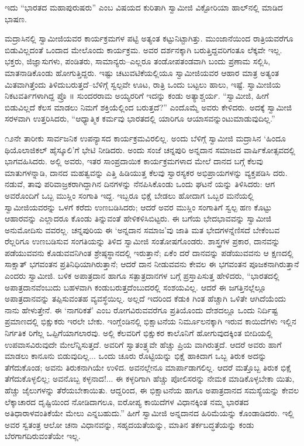 ಇದು “ಭಾರತದ ಮಹಾಪುರುಷರು” ಎಂಬ ವಿಷಯದ ಕುರಿತಾಗಿ ಸ್ವಾಮೀಜಿ ವಿಕ್ಟೋರಿಯಾ ಹಾಲ್​ನಲ್ಲಿ ಮಾಡಿದ ಭಾಷಣ.

ಮದ್ರಾಸಿನಲ್ಲಿ ಸ್ವಾಮೀಜಿಯವರ ಕಾರ್ಯಕ್ರಮಗಳ ಪಟ್ಟಿ ಅತ್ಯಂತ ಕಟ್ಟುನಿಟ್ಟಾಗಿತ್ತು. ಮುಂಜಾನೆಯಿಂದ ರಾತ್ರಿಯವರೆಗೂ ಬಿಡುವಿಲ್ಲದಂತೆ ಒಂದಾದ ಮೇಲೊಂದು ಕಾರ್ಯಕ್ರಮ. ಅವರ ದರ್ಶನಕ್ಕಾಗಿ ಬರುತ್ತಿದ್ದವರಿಗಂತೂ ಲೆಕ್ಕವೇ ಇಲ್ಲ. ಭಕ್ತರು, ಜಿಜ್ಞಾಸುಗಳು, ಪಂಡಿತರು, ಸಾಮಾನ್ಯರು–ಎಲ್ಲರೂ ತಂಡೋಪತಂಡವಾಗಿ ಬಂದು ಪ್ರಣಾಮ ಸಲ್ಲಿಸಿ, ಮಾತನಾಡಿಕೊಂಡು ಹೋಗುತ್ತಿದ್ದರು. ಇಷ್ಟು ಚಟುವಟಿಕೆಯಲ್ಲಿಯೂ ಸ್ವಾಮೀಜಿಯವರ ಆಹಾರ ಮಾತ್ರ ಅತ್ಯಂತ ಮಿತವಾಗಿತ್ತೆಂದು ತಿಳಿದುಬರುತ್ತದೆ–ಬೆಳಿಗ್ಗೆ ಸ್ವಲ್ಪವೇ ಊಟ, ರಾತ್ರಿ ಒಂದು ಬಟ್ಟಲು ಹಾಲು, ಇಷ್ಟೆ. ಸ್ವಾಮೀಜಿಯ ನಿಕಟವರ್ತಿಗಳಾಗಿದ್ದ ಪ್ರೊ ॥ ಸುಂದರರಾಮ ಅಯ್ಯರರಿಗೆ ಇದನ್ನು ಕಂಡು ಅತ್ಯಾಶ್ಚರ್ಯ. “ಸ್ವಾಮೀಜಿ, ಹೀಗೆ ಬಿಡುವಿಲ್ಲದೆ ಕೆಲಸ ಮಾಡಲು ನಿಮಗೆ ಶಕ್ತಿಯೆಲ್ಲಿಂದ ಬರುತ್ತದೆ?” ಎಂದೊಮ್ಮೆ ಅವರು ಕೇಳಿದರು. ಅದಕ್ಕೆ ಸ್ವಾಮೀಜಿ ಸರಳವಾಗಿ ಉತ್ತರಿಸಿದರು, “ಆಧ್ಯಾತ್ಮಿಕ ಕರ್ಮವು ಭಾರತದಲ್ಲಿ ಯಾರಿಗೂ ಆಯಾಸವನ್ನುಂಟುಮಾಡುವುದಿಲ್ಲ.”

೧೨ನೇ ತಾರೀಕು ಸಾರ್ವಜನಿಕ ಉಪನ್ಯಾಸದ ಕಾರ್ಯಕ್ರಮವಿರಲಿಲ್ಲ. ಅಂದು ಬೆಳಿಗ್ಗೆ ಸ್ವಾಮೀಜಿ ಮದ್ರಾಸಿನ ‘ಹಿಂದೂ ಥಿಯೊಲಾಜಿಕಲ್ ಹೈಸ್ಕೂಲಿ’ಗೆ ಭೇಟಿ ನೀಡಿದರು. ಅಂದು ಸಂಜೆ ಚನ್ನಪುರಿ ಅನ್ನದಾನ ಸಮಾಜದ ವಾರ್ಷಿಕೋತ್ಸವದಲ್ಲಿ ಭಾಗವಹಿಸಿದರು. ಅಲ್ಲಿ ಅವರು, ಇತರ ಸಾಂಪ್ರದಾಯಿಕ ಕಾರ್ಯಕ್ರಮಗಳಾದ ಮೇಲೆ ದಾನದ ಬಗ್ಗೆ ಕೆಲವು ಮಾತುಗಳನ್ನಾಡಿ, ದಾನದ ಮಹತ್ವವನ್ನು ಎತ್ತಿ ಹಿಡಿಯುತ್ತ ಕೆಲವು ಸ್ವಾರಸ್ಯಕರ ಅಭಿಪ್ರಾಯಗಳನ್ನು ವ್ಯಕ್ತಪಡಿಸಿ ದರು. ನಡುವೆ, ತಾವು ಪರಿವಾಜ್ರಕರಾಗಿದ್ದಾಗಿನ ದಿನಗಳನ್ನು ನೆನಪಿಸಿಕೊಂಡು ಒಂದು ಘಟನೆ ಯನ್ನು ತಿಳಿಸಿದರು: ಆಗ ಅವರೊಂದಿಗೆ ಒಬ್ಬ ಮುಸ್ಲಿಂ ಸಂಗಾತಿ ಇದ್ದ. ಇಬ್ಬರೂ ಭಿಕ್ಷೆ ಬೇಡಲು ಹೋದಾಗ ಒಬ್ಬರ ಮನೆಯಲ್ಲಿ ಸ್ವಾಮೀಜಿಯವರನ್ನು ಒಳಗೆ ಕರೆದು ಉಣಬಡಿಸಿದರು; ಆದರೆ ಅವರ ಮುಸ್ಲಿಂ ಸಂಗಾತಿಗೆ ಸ್ವಲ್ಪ ಹಣ ಕೊಟ್ಟು ಆಹಾರವನ್ನು ಎಲ್ಲಾದರೂ ಕೊಂಡು ತಿನ್ನುವಂತೆ ಹೇಳಿಕಳಿಸಿಬಿಟ್ಟರು. ಈ ಬಗೆಯ ಭೇದಭಾವವನ್ನು ಸ್ವಾಮೀಜಿ ಅನುಮೋದಿಸು ವವರಲ್ಲ. ಚನ್ನಪುರಿಯ ಈ ‘ಅನ್ನದಾನ ಸಮಾಜ’ವು ಜಾತಿ ಮತ ಭೇದಗಳನ್ನೆಣಿಸದೆ ಬೇಕೆಂಬವ ರೆಲ್ಲರಿಗೂ ಉಣಬಡಿಸುವ ಸಂಗತಿಯನ್ನು ತಿಳಿದ ಸ್ವಾಮೀಜಿ ಸಂತೋಷಗೊಂಡರು. ಶಾಸ್ತ್ರಗಳ ಪ್ರಕಾರ, ದಾನವನ್ನು ಪಡೆಯುವವನು ಕೊಡುವವನಿಗಿಂತ ಶ್ರೇಷ್ಠಸ್ಥಾನದಲ್ಲಿ ಇರುತ್ತಾನೆ; ಏಕೆಂ ದರೆ ದಾನವನ್ನು ಪಡೆಯುವವನು ಆ ಕ್ಷಣದಲ್ಲಿ ಸಾಕ್ಷಾತ್ ಭಗವಂತನ ಪ್ರತಿನಿಧಿಯಾಗಿರುತ್ತಾನೆ; ಆದರೆ ದಾನ ನೀಡುವವನು ಕೇವಲ ಈ ಭಗವಂತನ ಪೂಜಕನಾಗಿರುತ್ತಾನೆ ಎಂದರು ಸ್ವಾಮೀಜಿ. ಬಳಿಕ ಅಪಾತ್ರದಾನ ಹಾಗೂ ಸತ್ಪಾತ್ರದಾನಗಳ ಬಗ್ಗೆ ಪ್ರಸ್ತಾಪಿಸುತ್ತ ಹೇಳಿದರು, “ಭಾರತದಲ್ಲಿ ಅಪಾತ್ರದಾನವೆಂಬುದು ಬಹಳವಾಗಿ ಕಂಡುಬರುತ್ತದೆಂಬುದರಲ್ಲಿ ಸಂಶಯವಿಲ್ಲ. ಆದರೆ ಈ ಜಗತ್ತಿನಲ್ಲೆಲ್ಲೂ ಅಪಾತ್ರದಾನವನ್ನು ತಪ್ಪಿಸುವಂತಹ ವ್ಯವಸ್ಥೆಯಿಲ್ಲ. ಅಲ್ಲದೆ ಇದರಿಂದ ಕೆಡುಕಿ ಗಿಂತ ಹೆಚ್ಚಾಗಿ ಒಳಿತೇ ಆಗಿದೆಯೆಂದು ನಾನು ಹೇಳುತ್ತೇನೆ. ಈ ‘ನಾಗರಿಕತೆ’ ಎಂಬ ರೋಗವಿರುವವರೆಗೂ ಪ್ರತಿಯೊಂದು ದೇಶದಲ್ಲೂ ಒಂದು ನಿರ್ದಿಷ್ಟ ಪ್ರಮಾಣದಲ್ಲಿ ಭಿಕ್ಷುಕರು ಇರಲೇ ಬೇಕು. ಇಂಗ್ಲೆಂಡಿನಲ್ಲಿ ಭಿಕ್ಷಾಟನೆಯ ನಿರ್ಮೂಲನಕ್ಕಾಗಿ ಇರುವ ಕಾಯಿದೆಗಳು ಇಲ್ಲಿನ ನಿರ್ಗತಿಕ ರಿಗೆಲ್ಲ ಒಪ್ಪಿಗೆಯಾಗಲಾರವು. ಅಲ್ಲಿ ಕೆಲವರಿಗೆ ಭಿಕ್ಷುಕರ ಕಾಲೊನಿಗೆ ಹೋಗುವುದಕ್ಕಿಂತ ಬೀದಿಯಲ್ಲಿ ಉಪವಾಸವಿರುವುದೇ ಮೇಲೆನ್ನಿಸುತ್ತದೆ. ಅವರಿಗೆ ಸ್ವಾತಂತ್ರ್ಯವೇ ಹೆಚ್ಚು ಪ್ರಿಯ ವಾಗಿರುತ್ತದೆ. ಆದರೆ ಅವರು ಹಾಗೆ ಮಾಡಲು ಕಾನೂನು ಬಿಡುವುದಿಲ್ಲ... ಒಂದು ಚೂರು ರೊಟ್ಟಿಯನ್ನು ಭಿಕ್ಷೆ ಹಾಕಿದಾಗ ಒಬ್ಬ ತಿರುಕ ಅದನ್ನು ತೆಗೆದುಕೊಂಡ; ಅವನು ತಿರುಕನಾಗಿಯೇ ಉಳಿದ. ಅವನಲ್ಲೇನೂ ಮಾರ್ಪಾಡಾಗಲಿಲ್ಲ. ಆದರೆ ಮತ್ತೊಬ್ಬ ತಿರುಕ ಭಿಕ್ಷೆ ತೆಗೆದುಕೊಳ್ಳಲಿಲ್ಲ; ಅವನೊಬ್ಬ ಕಳ್ಳನಾದ!... ಈ ಕಳ್ಳರಿಗಾಗಿ ಹೆಚ್ಚು ಪೋಲಿಸರನ್ನು ನೇಮಕ ಮಾಡಿಕೊಳ್ಳಬೇಕಾ ಯಿತು, ಹೆಚ್ಚು ಜೈಲುಗಳನ್ನು ತೆರೆಯಬೇಕಾಯಿತು. ಆದ್ದರಿಂದ, ಈ ಭಿಕ್ಷಾಟನೆಯ ಹಾಗೂ ಅಪಾತ್ರದಾನದ ಸಮಸ್ಯೆಯನ್ನು ಕೇವಲ ಲೆಕ್ಕಾಚಾರದ ದೃಷ್ಟಿಯಿಂದ ನೋಡಿದಾಗಲೂ, ಐರೋಪ್ಯ ಕಾಯಿದೆಗಳ ವಿಧಾನಕ್ಕಿಂತ ನಮ್ಮ ಭಾರತದ ಅತಿಧಾರಾಳವಂತಿಕೆಯೇ ಮೇಲು ಎನ್ನಬಹುದು.” ಹೀಗೆ ಸ್ವಾಮೀಜಿ ಅನ್ನದಾನದ ಹಿರಿಮೆಯನ್ನು ಕೊಂಡಾಡಿದರು. ಇಲ್ಲಿ ಅವರ ಸ್ವತಂತ್ರ ಆಲೋ ಚನಾ ವಿಧಾನವನ್ನು, ಸಹೃದಯತೆಯನ್ನು, ಮಾತಿನ ತರ್ಕಬದ್ಧತೆಯನ್ನು ಕಂಡು ಬೆರಗಾಗದಿರುವಂತೆಯೇ ಇಲ್ಲ.

